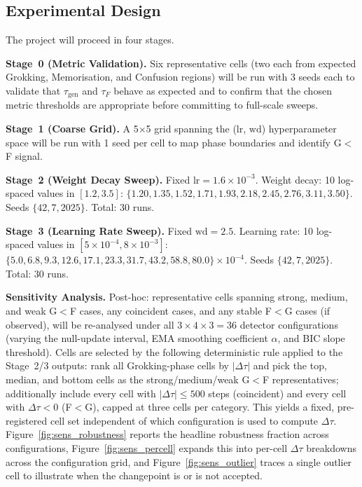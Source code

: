 \documentclass[12pt,openany,a4paper]{book}
\newcommand{\taug}{\tau_{\mathrm{gen}}}
\newcommand{\tauf}{\tau_{F}}
\newcommand{\Dtau}{\Delta\tau}
\begin{document}
\subsection{Experimental Design}

The project will proceed in four stages.

\textbf{Stage~0 (Metric Validation).}
Six representative cells (two each from expected Grokking,
Memorisation, and Confusion regions) will be run with 3 seeds each
to validate that $\taug$ and $\tauf$ behave as expected and to
confirm that the chosen metric thresholds are appropriate before
committing to full-scale sweeps.

\textbf{Stage~1 (Coarse Grid).}
A 5$\times$5 grid spanning the ($\mathrm{lr}$, $\mathrm{wd}$)
hyperparameter space will be run with 1 seed per cell to map phase
boundaries and identify G$<$F signal.

\textbf{Stage~2 (Weight Decay Sweep).}
Fixed $\mathrm{lr} = 1.6\times10^{-3}$.
Weight decay: 10 log-spaced values in $[1.2, 3.5]$:
$\{1.20, 1.35, 1.52, 1.71, 1.93, 2.18, 2.45, 2.76, 3.11, 3.50\}$.
Seeds $\{42, 7, 2025\}$. Total: 30 runs.

\textbf{Stage~3 (Learning Rate Sweep).}
Fixed $\mathrm{wd} = 2.5$.
Learning rate: 10 log-spaced values in $[5\times10^{-4}, 8\times10^{-3}]$:
$\{5.0, 6.8, 9.3, 12.6, 17.1, 23.3, 31.7, 43.2, 58.8, 80.0\}
\times 10^{-4}$.
Seeds $\{42, 7, 2025\}$. Total: 30 runs.

\textbf{Sensitivity Analysis.}
Post-hoc: representative cells spanning strong, medium, and weak
G$<$F cases, any coincident cases, and any stable F$<$G cases
(if observed), will be re-analysed under all $3\times4\times3 = 36$
detector configurations (varying the null-update interval, EMA
smoothing coefficient $\alpha$, and BIC slope threshold).
Cells are selected by the following deterministic rule applied to
the Stage~2/3 outputs: rank all Grokking-phase cells by $|\Dtau|$
and pick the top, median, and bottom cells as the strong/medium/weak
G$<$F representatives; additionally include every cell with
$|\Dtau|\leq 500$ steps (coincident) and every cell with
$\Dtau<0$ (F$<$G), capped at three cells per category.
This yields a fixed, pre-registered cell set independent of which
configuration is used to compute $\Dtau$.
Figure~\ref{fig:sens_robustness} reports the headline robustness fraction
across configurations, Figure~\ref{fig:sens_percell} expands this into
per-cell $\Dtau$ breakdowns across the configuration grid, and
Figure~\ref{fig:sens_outlier} traces a single outlier cell to
illustrate when the changepoint is or is not accepted.
\end{document}
